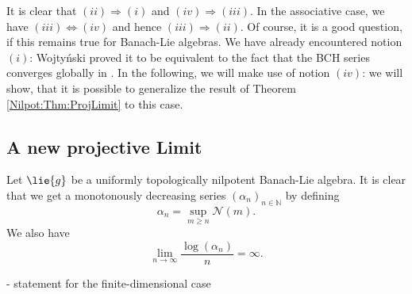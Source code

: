 It is clear that $(ii) \Rightarrow (i)$ and $(iv) \Rightarrow (iii)$. In the 
associative case, we have $(iii) \Leftrightarrow (iv)$ and hence $(iii) 
\Rightarrow (ii)$. Of course, it is a good question, if this remains true for 
Banach-Lie algebras. We have already encountered notion $(i)$: Wojty\'nski 
proved it to be equivalent to the fact that the BCH series converges globally 
in \cite{wojtynski:2000a}. In the following, we will make use of notion $(iv)$: 
we will show, that it is possible to generalize the result of Theorem 
\ref{Nilpot:Thm:ProjLimit} to this case.


\subsection{A new projective Limit}

Let $\lie{g}$ be a uniformly topologically nilpotent Banach-Lie algebra. 
It is clear that we get a monotonously decreasing series 
$(\alpha_n)_{n \in \mathbb{N}}$ by defining
\begin{equation}
	\alpha_n
	=
	\sup_{m \geq n} \mathcal{N}(m).	
\end{equation}
We also have
\begin{equation*}
	\lim_{n \longrightarrow \infty}
	\frac{\log( \alpha_n )}{n}
	=
	\infty.
\end{equation*}

	 - statement for the finite-dimensional case